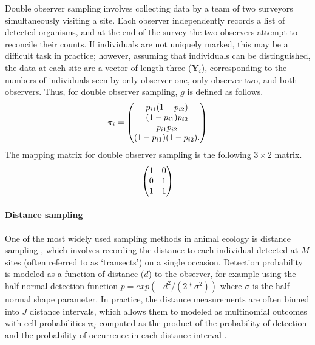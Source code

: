 \documentclass[article,shortnames]{jss}
\begin{document}
Double observer sampling involves collecting data by a team of two surveyors
simultaneously visiting a site.  Each observer independently records a list 
of detected organisms, and at the end of the survey the two observers attempt 
to reconcile their counts.  If individuals are not uniquely marked, this may 
be a difficult task in practice; however, assuming that individuals can 
be distinguished, the data at each site are a vector of length three 
($\mathbf Y_i$), corresponding to the numbers of individuals seen by 
only observer one, only observer two, and both observers.  Thus, for 
double observer sampling, $g$ is defined as follows.
\begin{equation}
  \mathbf \pi_i =
  \begin{pmatrix}
    p_{i1}(1-p_{i2}) \\
    (1-p_{i1})p_{i2} \\
    p_{i1}p_{i2} \\
    (1-p_{i1})(1-p_{i2}).
  \end{pmatrix} \notag
\end{equation}
The  mapping matrix for double observer sampling is the
following $3 \times 2$ matrix.
\begin{equation}
  \begin{pmatrix}
    1 & 0 \\
    0 & 1 \\
    1 & 1 
  \end{pmatrix} \notag
\end{equation}

\paragraph{Distance sampling}
\label{sec:distsamp}

One of the most widely used sampling methods in animal ecology is 
distance sampling \citep{BucklandEA01}, which involves recording the 
distance to each individual detected at $M$ sites (often referred to as 
`transects') on a single occasion.  
Detection probability is modeled as a function of distance ($d$) to the observer, 
for example using the half-normal detection function 
$p = exp(-d^2/(2*\sigma^2))$ where $\sigma$ is the half-normal shape 
parameter.  In practice, the distance measurements are often binned into 
$J$ distance intervals, which allows them to modeled as multinomial 
outcomes with cell probabilities $\mathbf \pi_i$ computed as the product of the 
probability of detection and the probability of 
occurrence in each distance interval \citep{Royle2004b}.  
\end{document}
